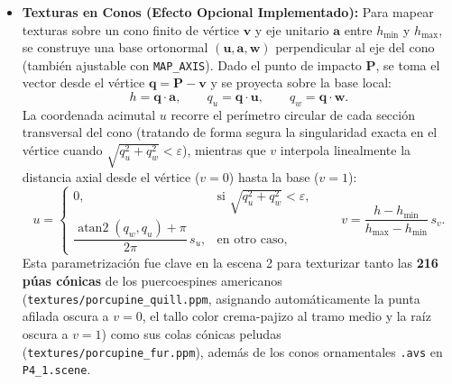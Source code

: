 \documentclass[11pt,letterpaper]{article}
\begin{document}
\begin{itemize}[leftmargin=1.5em]
    \item \textbf{Texturas en Conos (Efecto Opcional Implementado):}
    Para mapear texturas sobre un cono finito de vértice $\mathbf{v}$ y eje unitario $\mathbf{a}$ entre $h_{\min}$ y $h_{\max}$, se construye una base ortonormal $(\mathbf{u}, \mathbf{a}, \mathbf{w})$ perpendicular al eje del cono (también ajustable con \texttt{MAP\_AXIS}). Dado el punto de impacto $\mathbf{P}$, se toma el vector desde el vértice $\mathbf{q} = \mathbf{P} - \mathbf{v}$ y se proyecta sobre la base local:
    \[
        h = \mathbf{q}\cdot\mathbf{a}, \qquad
        q_u = \mathbf{q}\cdot\mathbf{u}, \qquad
        q_w = \mathbf{q}\cdot\mathbf{w}.
    \]
    La coordenada acimutal $u$ recorre el perímetro circular de cada sección transversal del cono (tratando de forma segura la singularidad exacta en el vértice cuando $\sqrt{q_u^2 + q_w^2} < \varepsilon$), mientras que $v$ interpola linealmente la distancia axial desde el vértice ($v=0$) hasta la base ($v=1$):
    \[
        u = \begin{cases}
            0, & \text{si } \sqrt{q_u^2 + q_w^2} < \varepsilon,\\[0.4em]
            \dfrac{\operatorname{atan2}(q_w, q_u) + \pi}{2\pi}\,s_u, & \text{en otro caso,}
        \end{cases}
        \qquad
        v = \frac{h - h_{\min}}{h_{\max} - h_{\min}}\,s_v.
    \]
    Esta parametrización fue clave en la escena 2 para texturizar tanto las \textbf{216 púas cónicas} de los puercoespines americanos (\texttt{textures/porcupine\_quill.ppm}, asignando automáticamente la punta afilada oscura a $v=0$, el tallo color crema-pajizo al tramo medio y la raíz oscura a $v=1$) como sus colas cónicas peludas (\texttt{textures/porcupine\_fur.ppm}), además de los conos ornamentales \texttt{.avs} en \texttt{P4\_1.scene}.
\end{itemize}
\end{document}
